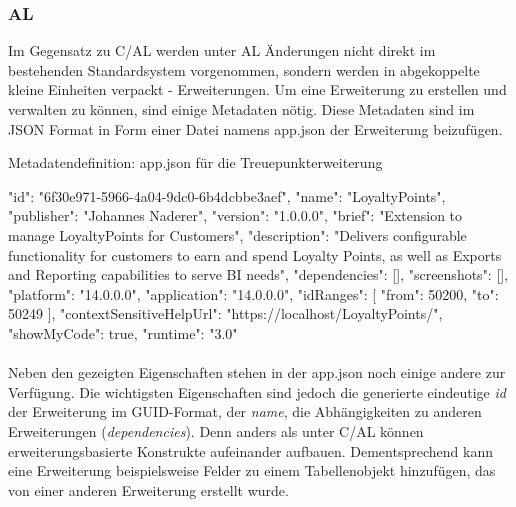 \pagebreak
\subsubsection{AL}

Im Gegensatz zu C/AL werden unter AL Änderungen nicht direkt im bestehenden Standardsystem vorgenommen, sondern werden in abgekoppelte kleine Einheiten verpackt - Erweiterungen. Um eine Erweiterung zu erstellen und verwalten zu können, sind einige Metadaten nötig. Diese Metadaten sind im JSON Format in Form einer Datei namens app.json der Erweiterung beizufügen. 

\begin{program}[H]  %
	\centering
	\caption{Metadatendefinition: app.json für die Treuepunkterweiterung}
	\label{prog:App.json}
	\begin{JavaCode}
{
	"id": "6f30e971-5966-4a04-9dc0-6b4dcbbe3aef",
	"name": "LoyaltyPoints",
	"publisher": "Johannes Naderer",
	"version": "1.0.0.0",
	"brief": "Extension to manage LoyaltyPoints for Customers",
	"description": "Delivers configurable functionality for customers to earn and spend Loyalty Points, as well as Exports and Reporting capabilities to serve BI needs",
	"dependencies": [],
	"screenshots": [],
	"platform": "14.0.0.0",
	"application": "14.0.0.0",
	"idRanges": [
	{
		"from": 50200,
		"to": 50249
	}
	],
	"contextSensitiveHelpUrl": "https://localhost/LoyaltyPoints/",
	"showMyCode": true,
	"runtime": "3.0"
}
	\end{JavaCode}
\end{program}

\paragraph{}
Neben den gezeigten Eigenschaften stehen in der app.json noch einige andere zur Verfügung. Die wichtigsten Eigenschaften sind jedoch die generierte eindeutige \textit{id} der Erweiterung im GUID-Format, der \textit{name}, die Abhängigkeiten zu anderen Erweiterungen (\textit{dependencies}). Denn anders als unter C/AL können erweiterungsbasierte Konstrukte aufeinander aufbauen. Dementsprechend kann eine Erweiterung beispielsweise Felder zu einem Tabellenobjekt hinzufügen, das von einer anderen Erweiterung erstellt wurde.
\linebreak

